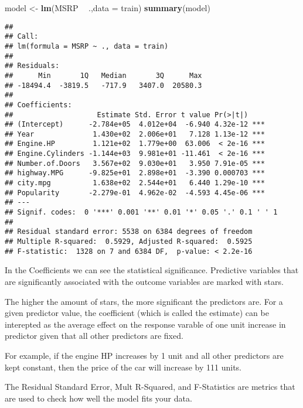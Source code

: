 \documentclass[
]{article}
\newenvironment{Shaded}{\begin{snugshade}}{\end{snugshade}}
\newcommand{\DataTypeTok}[1]{\textcolor[rgb]{0.13,0.29,0.53}{#1}}
\newcommand{\KeywordTok}[1]{\textcolor[rgb]{0.13,0.29,0.53}{\textbf{#1}}}
\newcommand{\NormalTok}[1]{#1}
\newcommand{\OperatorTok}[1]{\textcolor[rgb]{0.81,0.36,0.00}{\textbf{#1}}}
\newcommand{\StringTok}[1]{\textcolor[rgb]{0.31,0.60,0.02}{#1}}
\begin{document}
\begin{Shaded}
\begin{Highlighting}[]
\NormalTok{model <-}\StringTok{ }\KeywordTok{lm}\NormalTok{(MSRP }\OperatorTok{~}\StringTok{ }\NormalTok{.,}\DataTypeTok{data =}\NormalTok{ train)}
\KeywordTok{summary}\NormalTok{(model)}
\end{Highlighting}
\end{Shaded}

\begin{verbatim}
## 
## Call:
## lm(formula = MSRP ~ ., data = train)
## 
## Residuals:
##      Min       1Q   Median       3Q      Max 
## -18494.4  -3819.5   -717.9   3407.0  20580.3 
## 
## Coefficients:
##                    Estimate Std. Error t value Pr(>|t|)    
## (Intercept)      -2.784e+05  4.012e+04  -6.940 4.32e-12 ***
## Year              1.430e+02  2.006e+01   7.128 1.13e-12 ***
## Engine.HP         1.121e+02  1.779e+00  63.006  < 2e-16 ***
## Engine.Cylinders -1.144e+03  9.981e+01 -11.461  < 2e-16 ***
## Number.of.Doors   3.567e+02  9.030e+01   3.950 7.91e-05 ***
## highway.MPG      -9.825e+01  2.898e+01  -3.390 0.000703 ***
## city.mpg          1.638e+02  2.544e+01   6.440 1.29e-10 ***
## Popularity       -2.279e-01  4.962e-02  -4.593 4.45e-06 ***
## ---
## Signif. codes:  0 '***' 0.001 '**' 0.01 '*' 0.05 '.' 0.1 ' ' 1
## 
## Residual standard error: 5538 on 6384 degrees of freedom
## Multiple R-squared:  0.5929, Adjusted R-squared:  0.5925 
## F-statistic:  1328 on 7 and 6384 DF,  p-value: < 2.2e-16
\end{verbatim}

In the Coefficients we can see the statistical significance. Predictive
variables that are significantly associated with the outcome variables
are marked with stars.

The higher the amount of stars, the more significant the predictors are.
For a given predictor value, the coefficient (which is called the
estimate) can be interepted as the average effect on the response
varable of one unit increase in predictor given that all other
predictors are fixed.

For example, if the engine HP increases by 1 unit and all other
predictors are kept constant, then the price of the car will increase by
111 units.

The Residual Standard Error, Mult R-Squared, and F-Statistics are
metrics that are used to check how well the model fits your data.
\end{document}
